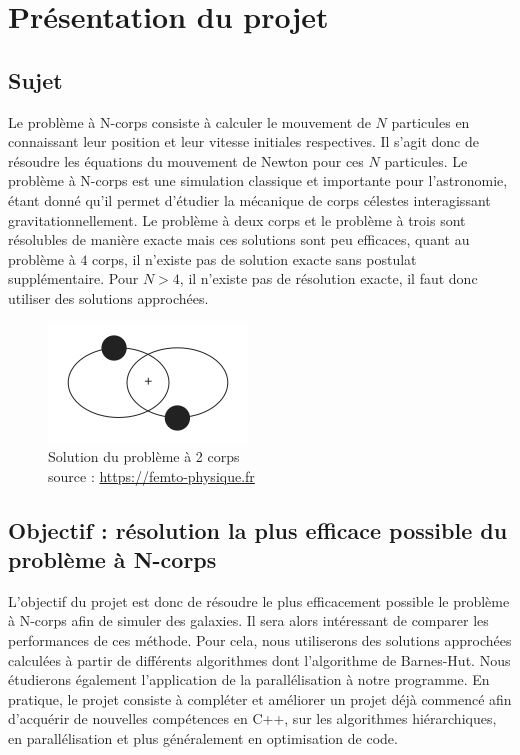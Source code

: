 \chapter{Présentation du projet}
\section{Sujet}
Le problème à N-corps consiste à calculer le mouvement de  $N$ particules en connaissant leur position et leur vitesse initiales respectives.
Il s'agit donc de résoudre les équations du mouvement de Newton pour ces $N$ particules.
Le problème à N-corps est une simulation classique et importante pour l'astronomie, étant donné qu'il permet d'étudier la mécanique de corps célestes interagissant gravitationnellement.
Le problème à deux corps et le problème à trois sont résolubles de manière exacte mais ces solutions sont peu efficaces, quant au problème à $4$ corps, il n'existe pas de solution exacte sans postulat supplémentaire. Pour $N>4$, il n'existe pas de résolution exacte, il faut donc utiliser des solutions approchées.

\begin{figure}[!h]
\begin{center}
\includegraphics[scale=0.8]{presentation/two.png}
\captionsetup{hypcap=false}
\caption{Solution du problème à 2 corps \\
source : \url{https://femto-physique.fr}}
\label{fig1}
\end{center}
\end{figure}

\section{Objectif : résolution la plus efficace possible du problème à N-corps}

L'objectif du projet est donc de résoudre le plus efficacement possible le problème à N-corps afin de simuler des galaxies.
Il sera alors intéressant de comparer les performances de ces méthode.
Pour cela, nous utiliserons des solutions approchées calculées à partir de différents algorithmes dont l'algorithme de Barnes-Hut. Nous étudierons également l'application de la parallélisation à notre programme.
En pratique, le projet consiste à compléter et améliorer un projet déjà commencé afin d'acquérir de nouvelles compétences en C++, sur les algorithmes hiérarchiques, en parallélisation et plus généralement en optimisation de code.

